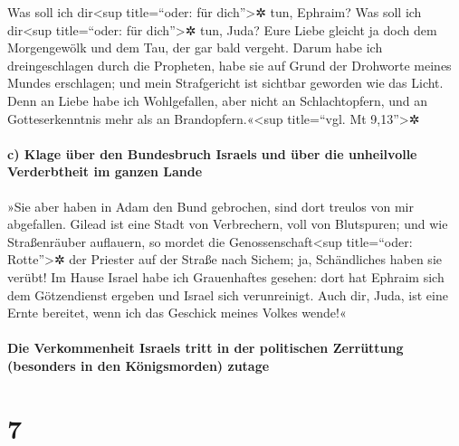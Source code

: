  Was soll ich dir\textless sup title=``oder: für
dich''\textgreater✲ tun, Ephraim? Was soll ich dir\textless sup
title=``oder: für dich''\textgreater✲ tun, Juda? Eure Liebe gleicht ja
doch dem Morgengewölk und dem Tau, der gar bald vergeht. 
Darum habe ich dreingeschlagen durch die Propheten, habe sie auf Grund
der Drohworte meines Mundes erschlagen; und mein Strafgericht ist
sichtbar geworden wie das Licht.  Denn an Liebe habe ich
Wohlgefallen, aber nicht an Schlachtopfern, und an Gotteserkenntnis mehr
als an Brandopfern.«\textless sup title=``vgl. Mt 9,13''\textgreater✲

\hypertarget{c-klage-uxfcber-den-bundesbruch-israels-und-uxfcber-die-unheilvolle-verderbtheit-im-ganzen-lande}{%
\paragraph{c) Klage über den Bundesbruch Israels und über die
unheilvolle Verderbtheit im ganzen
Lande}\label{c-klage-uxfcber-den-bundesbruch-israels-und-uxfcber-die-unheilvolle-verderbtheit-im-ganzen-lande}}

 »Sie aber haben in Adam den Bund gebrochen, sind dort
treulos von mir abgefallen.  Gilead ist eine Stadt von
Verbrechern, voll von Blutspuren;  und wie Straßenräuber
auflauern, so mordet die Genossenschaft\textless sup title=``oder:
Rotte''\textgreater✲ der Priester auf der Straße nach Sichem; ja,
Schändliches haben sie verübt!  Im Hause Israel habe ich
Grauenhaftes gesehen: dort hat Ephraim sich dem Götzendienst ergeben und
Israel sich verunreinigt.  Auch dir, Juda, ist eine Ernte
bereitet, wenn ich das Geschick meines Volkes wende!«

\hypertarget{die-verkommenheit-israels-tritt-in-der-politischen-zerruxfcttung-besonders-in-den-kuxf6nigsmorden-zutage}{%
\paragraph{Die Verkommenheit Israels tritt in der politischen Zerrüttung
(besonders in den Königsmorden)
zutage}\label{die-verkommenheit-israels-tritt-in-der-politischen-zerruxfcttung-besonders-in-den-kuxf6nigsmorden-zutage}}

\hypertarget{section-6}{%
\section{7}\label{section-6}}

